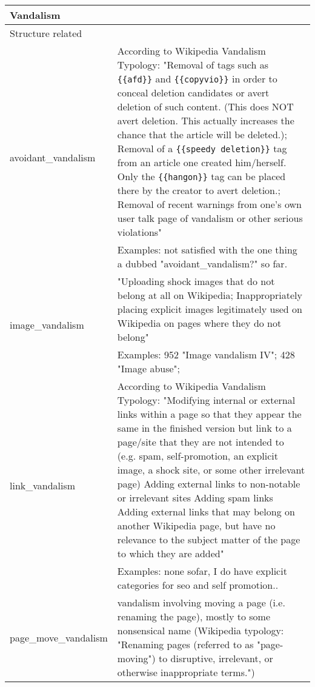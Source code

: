 \begin{longtable}{ | p{5cm} | p{9cm} | }
    \hline
        \multicolumn{2}{|l|}{Vandalism} \\
    \hline
        \multicolumn{2}{|l|}{Structure related} \\
    \hline
    \multirow{2}{*}{avoidant\_vandalism} & According to Wikipedia Vandalism Typology: "Removal of tags such as \verb|{{afd}}| and \verb|{{copyvio}}| in order to conceal deletion candidates or avert deletion of such content. (This does NOT avert deletion. This actually increases the chance that the article will be deleted.); Removal of a \verb|{{speedy deletion}}| tag from an article one created him/herself. Only the \verb|{{hangon}}| tag can be placed there by the creator to avert deletion.; Removal of recent warnings from one's own user talk page of vandalism or other serious violations"~\cite{Wikipedia:VandalismTypes} \\
                                     & Examples: not satisfied with the one thing a dubbed "avoidant\_vandalism?" so far.\\
    \hline
    \multirow{2}{*}{image\_vandalism} & "Uploading shock images that do not belong at all on Wikipedia; Inappropriately placing explicit images legitimately used on Wikipedia on pages where they do not belong"~\cite{Wikipedia:VandalismTypes} \\
                                     & Examples: 952 "Image vandalism IV"; 428 "Image abuse";\\
    \hline
    \multirow{2}{*}{link\_vandalism} & According to Wikipedia Vandalism Typology: "Modifying internal or external links within a page so that they appear the same in the finished version but link to a page/site that they are not intended to (e.g. spam, self-promotion, an explicit image, a shock site, or some other irrelevant page)
    Adding external links to non-notable or irrelevant sites
    Adding spam links
    Adding external links that may belong on another Wikipedia page, but have no relevance to the subject matter of the page to which they are added"~\cite{Wikipedia:VandalismTypes} \\
                               & Examples: none sofar, I do have explicit categories for seo and self promotion..\\ %
    \hline
    \multirow{2}{*}{page\_move\_vandalism} & vandalism involving moving a page (i.e. renaming the page), mostly to some nonsensical name
  (Wikipedia typology: "Renaming pages (referred to as "page-moving") to disruptive, irrelevant, or otherwise inappropriate terms.") \\

\end{longtable}
